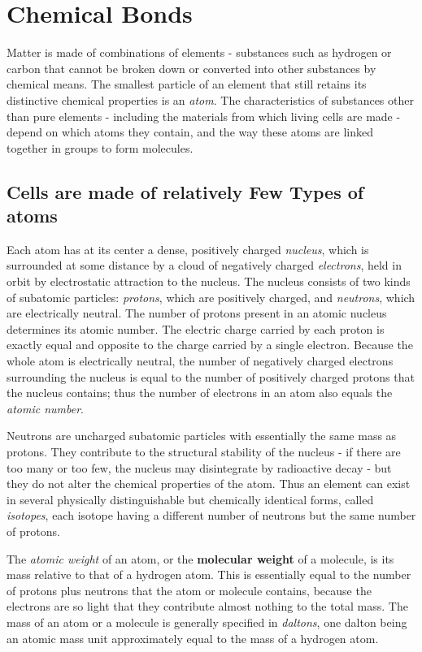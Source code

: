 \section{Chemical Bonds}

Matter is made of combinations of elements - substances such as hydrogen
or carbon that cannot be broken down or converted into other
substances by chemical means. The smallest particle of an element that
still retains its distinctive chemical properties is an \textit{atom}. The characteristics
of substances other than pure elements - including the materials
from which living cells are made - depend on which atoms they contain,
and the way these atoms are linked together in groups to form molecules.

\subsection{Cells are made of relatively Few Types of atoms}

Each atom has at its center a dense, positively charged \textit{nucleus}, which
is surrounded at some distance by a cloud of negatively charged \textit{electrons},
held in orbit by electrostatic attraction to the nucleus.
The nucleus consists of two kinds of subatomic particles: \textit{protons}, which
are positively charged, and \textit{neutrons}, which are electrically neutral. The
number of protons present in an atomic nucleus determines its atomic
number. The electric charge carried by each proton is exactly
equal and opposite to the charge carried by a single electron. Because
the whole atom is electrically neutral, the number of negatively charged
electrons surrounding the nucleus is equal to the number of positively
charged protons that the nucleus contains; thus the number of electrons
in an atom also equals the \textit{atomic number}.

Neutrons are uncharged subatomic particles with essentially the same
mass as protons. They contribute to the structural stability of the nucleus -
if there are too many or too few, the nucleus may disintegrate by
radioactive decay - but they do not alter the chemical properties of the
atom. Thus an element can exist in several physically distinguishable but
chemically identical forms, called \textit{isotopes}, each isotope having a different
number of neutrons but the same number of protons.

The \textit{atomic weight} of an atom, or the \textbf{molecular weight} of a molecule,
is its mass relative to that of a hydrogen atom. This is essentially equal to
the number of protons plus neutrons that the atom or molecule contains,
because the electrons are so light that they contribute almost nothing to
the total mass. The mass of an atom or a molecule is generally specified in
\textit{daltons}, one dalton being an atomic mass unit approximately equal to the mass
of a hydrogen atom.

